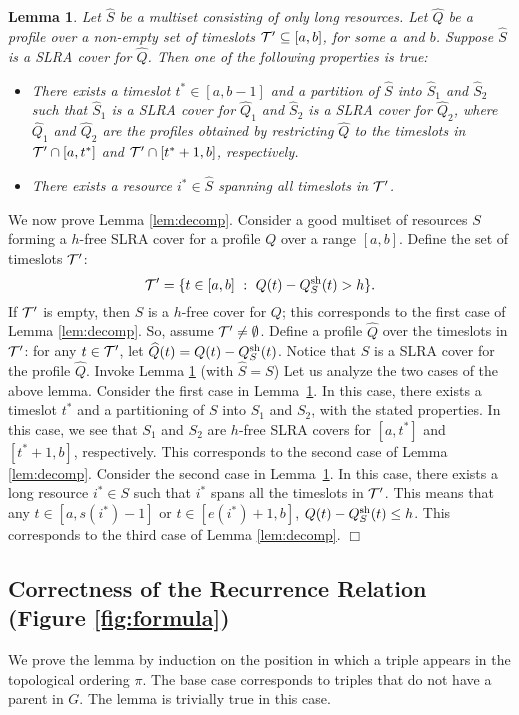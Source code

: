 \documentclass[11pt]{article}
\newtheorem{lemma}[theorem]{Lemma}
\newcommand{\qed} {\hfill$\Box$}
\newcommand{\sh} {{\rm sh}}
\newcommand{\calT} {{\cal T}}
\newcommand{\wh}[1] {\widehat{#1}}
\begin{document}
\begin{lemma}
\label{lem:esa-timecut}
Let $\wh{S}$ be a multiset consisting of only long resources. 
Let $\wh{Q}$ be a profile over a non-empty set of timeslots $\calT'\subseteq [a,b]$,
for some $a$ and $b$. 
Suppose $\wh{S}$ is a SLRA cover for $\wh{Q}$. Then one of the following properties is true:
\begin{itemize}
\item
There exists a timeslot $t^*\in [a,b-1]$ and a partition of $\wh{S}$ into $\wh{S}_1$ and $\wh{S}_2$ such that
$\wh{S}_1$ is a SLRA cover for $\wh{Q}_1$ and $\wh{S}_2$ is a SLRA cover for $\wh{Q}_2$,
where $\wh{Q}_1$ and $\wh{Q}_2$ are the profiles obtained by restricting $\wh{Q}$
to the timeslots in $\calT'\cap [a,t^*]$ and $\calT'\cap [t^*+1,b]$, respectively.
\item
There exists a resource $i^*\in \wh{S}$ spanning all timeslots in $\calT'$.
\end{itemize}
\end{lemma}

We now prove Lemma \ref{lem:decomp}. 
Consider a good multiset of resources $S$ forming a $h$-free SLRA cover for a profile $Q$ over a range $[a,b]$.
Define the set of timeslots $\calT'$:
\[
\calT' = \{t\in [a,b]~:~Q(t)-Q^{\sh}_S(t)>h\}.
\]
If $\calT'$ is empty, then $S$ is a $h$-free cover for $Q$; 
this corresponds to the first case of Lemma \ref{lem:decomp}.
So, assume $\calT'\neq \emptyset$.
Define a profile $\wh{Q}$ over the timeslots in $\calT'$: for any $t\in \calT'$,
let $\wh{Q}(t) = Q(t)-Q^{\sh}_S(t)$.
Notice that $S$ is a SLRA cover for the profile $\wh{Q}$. 
Invoke Lemma \ref{lem:esa-timecut} (with $\wh{S}=S$)
Let us analyze the two cases of the above lemma. 
Consider the first case in Lemma~\ref{lem:esa-timecut}. 
In this case, there exists a timeslot $t^*$ and a partitioning of $S$ into $S_1$ and $S_2$,
with the stated properties.
In this case, we see that $S_1$ and $S_2$ are $h$-free SLRA covers
for $[a,t^*]$ and $[t^*+1,b]$, respectively. This corresponds to the second case of Lemma \ref{lem:decomp}.
Consider the second case in Lemma~\ref{lem:esa-timecut}. In this case, there exists a long resource $i^*\in S$ such that $i^*$ spans
all the timeslots in $\calT'$. This means that any $t\in [a,s(i^*)-1]$ or $t\in [e(i^*)+1,b]$,
$Q(t)-Q^{\sh}_S(t) \leq h$. This corresponds to the third case of Lemma \ref{lem:decomp}.
\qed

\subsection{Correctness of the Recurrence Relation (Figure \ref{fig:formula})}
\label{sec:recur-proof}
We prove the lemma by induction on the position in which a triple appears in the topological ordering $\pi$.
The base case corresponds to triples that do not have a parent in $G$. The lemma is trivially true in this case.
\end{document}
